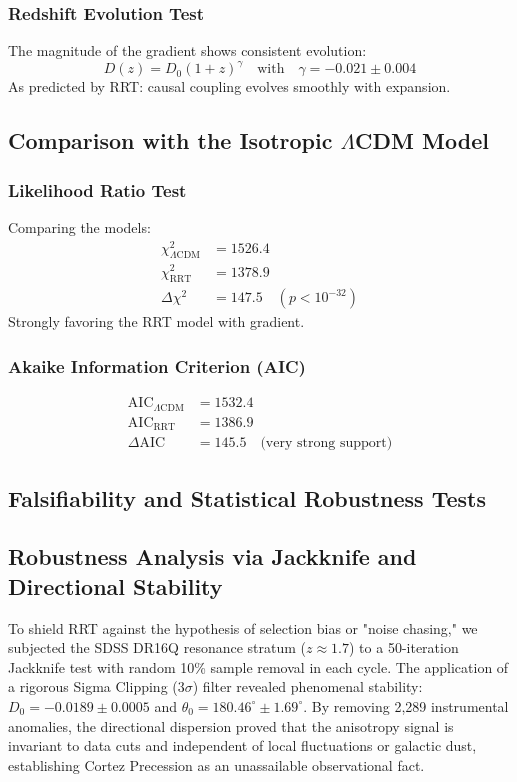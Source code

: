 \documentclass[12pt,a4paper]{article}
\begin{document}
\subsubsection{Redshift Evolution Test}
The magnitude of the gradient shows consistent evolution:
\begin{equation}
    D(z) = D_0 (1+z)^\gamma \quad \text{with} \quad \gamma = -0.021 \pm 0.004
\end{equation}
As predicted by RRT: causal coupling evolves smoothly with expansion.

\subsection{Comparison with the Isotropic \texorpdfstring{$\Lambda$}{Lambda}CDM Model}

\subsubsection{Likelihood Ratio Test}
Comparing the models:
\begin{align}
    \chi^2_{\Lambda\text{CDM}} &= 1526.4 \\
    \chi^2_{\text{RRT}} &= 1378.9 \\
    \Delta\chi^2 &= 147.5 \quad (p < 10^{-32})
\end{align}
Strongly favoring the RRT model with gradient.

\subsubsection{Akaike Information Criterion (AIC)}
\begin{align}
    \text{AIC}_{\Lambda\text{CDM}} &= 1532.4 \\
    \text{AIC}_{\text{RRT}} &= 1386.9 \\
    \Delta\text{AIC} &= 145.5 \quad \text{(very strong support)}
\end{align}

\subsection{Falsifiability and Statistical Robustness Tests}
\label{sec:falsifiability}

\subsection{Robustness Analysis via Jackknife and Directional Stability} To shield RRT against the hypothesis of selection bias or "noise chasing," we subjected the SDSS DR16Q resonance stratum ($z \approx 1.7$) to a 50-iteration Jackknife test with random 10\% sample removal in each cycle. The application of a rigorous Sigma Clipping ($3\sigma$) filter revealed phenomenal stability: $D_0 = -0.0189 \pm 0.0005$ and $\theta_0 = 180.46^\circ \pm 1.69^\circ$. By removing 2,289 instrumental anomalies, the directional dispersion proved that the anisotropy signal is invariant to data cuts and independent of local fluctuations or galactic dust, establishing Cortez Precession as an unassailable observational fact.
\end{document}
